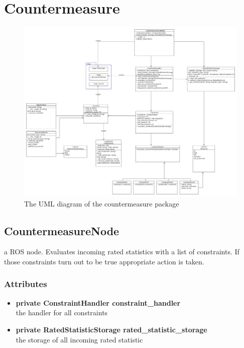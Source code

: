 \newpage
\section{Countermeasure}
\begin{figure}[!ht]
\begin{center}
\includegraphics[width=1.0\linewidth]{./diagram_pictures/reactor.jpg}
\caption{The UML diagram of the countermeasure package}
\end{center}
\end{figure}

\mbox{}

\newpage


\subsection{CountermeasureNode}
a ROS node. Evaluates incoming rated statistics with a list of constraints. If those constraints turn out to be true appropriate action is taken.
\subsubsection{Attributes}
\begin{itemize}
	\item \textbf{ private ConstraintHandler constraint\_handler}\\
		the handler for all constraints
	\item \textbf{ private RatedStatisticStorage rated\_statistic\_storage}\\
		the storage of all incoming rated statistic
\end{itemize}
